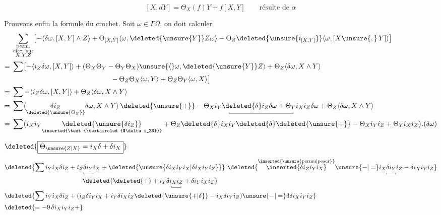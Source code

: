
\[
\boxed{[X,dY]=\Theta_X(f)Y+f[X,Y]}\qquad\text{résulte de }\alpha
\]

Prouvons enfin la formule du crochet. Soit $\omega\in\Gamma\Omega$, on doit  calculer
\[
\begin{aligned}
&\sum_{\substack{\text{perm.}\\\text{circ. sur}\\X,Y,Z}}
\bigl[-\langle\delta\omega,[X,Y]\wedge Z\rangle+\Theta_{[X,Y]}\langle\omega,\deleted{\unsure{Y}}Z\omega\rangle-\Theta_Z\deleted{\unsure{i_{[X,Y]}}}\langle\omega,[X\unsure{,}\,Y]\rangle\bigr]\\
={}&\sum\bigl[-\langle i_Z\delta\omega,[X,Y]\rangle+(\Theta_X\Theta_Y-\Theta_Y\Theta_X)\unsure{\langle}\omega,\deleted{\unsure{Y}}Z\rangle+\Theta_Z\langle\delta\omega,X\wedge Y\rangle\\
&\hspace{14em}-\Theta_Z\Theta_X\langle\omega,Y\rangle+\Theta_Z\Theta_Y\langle\omega,X\rangle\bigr]\\
={}&\sum-\langle i_Z\delta\omega,[X,Y]\rangle+\Theta_Z\langle\delta\omega,X\wedge Y\rangle\\
={}&\sum\langle\underset{\deleted{\unsure{\Theta_Z}}}{\delta i_Z}\delta\omega,X\wedge Y\rangle\,
\deleted{\unsure{+}}-\underset{\smash{\rule{.35pt}{2pt}\rule{9em}{.35pt}\rule{.35pt}{2pt}}}{\Theta_X i_Y\deleted{\delta}i_Z\delta\omega+\Theta_Y i_X i_Z\delta\omega}+\Theta_Z\langle\delta\omega,X\wedge Y\rangle\\
={}&\sum\bigl(i_X i_Y\underset{\inserted{\text{\textcircled{$\delta i_Z$}}}}{\deleted{\unsure{\delta i_Z}}}+\Theta_Z\deleted{\delta}i_X i_Y\deleted{\delta}\deleted{\unsure{+}}-\Theta_X i_Y i_Z+\Theta_Y i_X i_Z\bigr).(\delta\omega)
\end{aligned}
\]

 $\deleted{\boxed{\Theta_{\unsure{Z|X}}=i_X\delta+\delta i_X}}$ 
\[
\begin{aligned}
&\deleted{\sum i_Y i_X\delta i_Z+i_Z\underset{\smash{\rule{.35pt}{2pt}\rule{1.4em}{.35pt}\rule{.35pt}{2pt}}}{\delta i_Y}i_X+\deleted{\unsure{\delta i_X i_Y i_X|\delta i_X i_Y i_Z}}}
\ \deleted{\overset{\inserted{\text{\unsure{permu|poser}}}}{\inserted{\delta i_Z i_Y i_X}}\unsure{-|=}i_X\underset{\smash{\rule{.35pt}{2pt}\rule{1.4em}{.35pt}\rule{.35pt}{2pt}}}{\delta i_Y}i_Z-\delta i_X i_Y i_Z}\\
&\hspace{12em}\deleted{\deleted{+}+i_Y\delta\underset{\smash{\rule{.35pt}{2pt}\rule{1.4em}{.35pt}\rule{.35pt}{2pt}}}{i_X i_Z}+\delta i_Y i_X i_Z}\\
&\deleted{\sum i_Y i_X\delta i_Z+(i_Z\delta i_Y i_X+i_Y\delta i_X i_Z\deleted{\unsure{+|\delta}}-i_X\delta i_Y i_Z)\unsure{-|=}3\delta i_X i_Y i_Z}\\
&\deleted{=-9\,\delta i_X i_Y i_Z+}
\end{aligned}
\]

